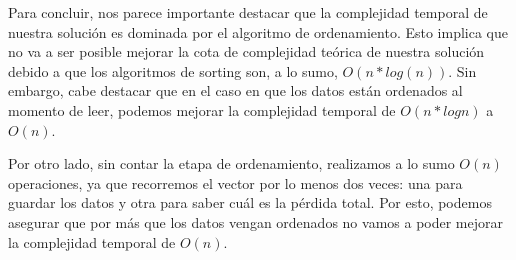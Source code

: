 Para concluir, nos parece importante destacar que la complejidad temporal de nuestra solución es dominada por el algoritmo de ordenamiento. Esto implica que no va a ser posible mejorar la cota de complejidad teórica de nuestra solución debido a que los algoritmos de sorting son, a lo sumo, $O(n*log(n))$. Sin embargo, cabe destacar que en el caso en que los datos están ordenados al momento de leer, podemos mejorar la complejidad temporal de $O(n * log n)$ a $O(n)$.

Por otro lado, sin contar la etapa de ordenamiento, realizamos a lo sumo $O(n)$ operaciones, ya que recorremos el vector por lo menos dos veces: una para guardar los datos y otra para saber cuál es la pérdida total. Por esto, podemos asegurar que por más que los datos vengan ordenados no vamos a poder mejorar la complejidad temporal de $O(n)$.